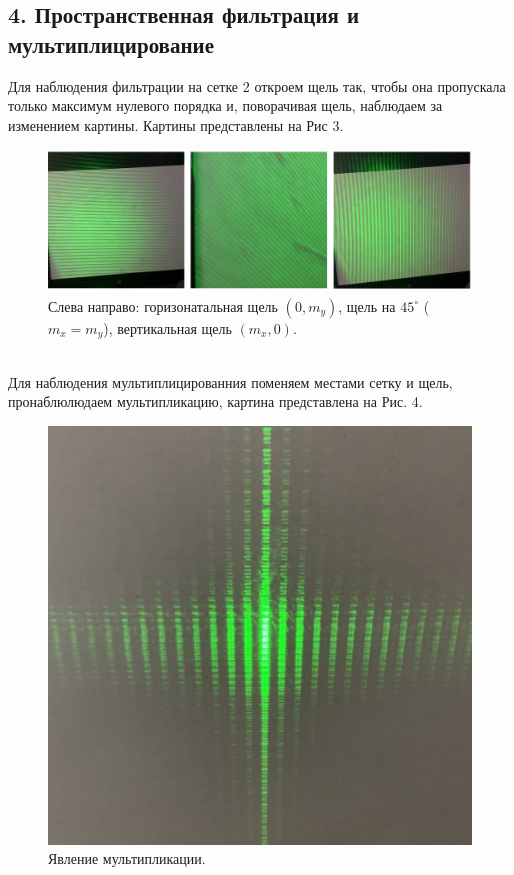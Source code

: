 \documentclass[a4paper,12pt]{article}
\begin{document}
\subsection*{4. Пространственная фильтрация и мультиплицирование}
Для наблюдения фильтрации на сетке 2 откроем щель так, чтобы она пропускала только максимум нулевого порядка и, поворачивая щель, наблюдаем за изменением картины. Картины представлены на Рис 3.
\begin{figure}[h]
\includegraphics[scale=0.5]{3.png}
\centering
\caption{Слева направо: горизонатальная щель $(0,m_y)$, щель на $45^\circ$ ($m_x = m_y$), вертикальная щель $(m_x,0)$.}
\end{figure}\\
Для наблюдения мультиплицированния поменяем местами сетку и щель, пронаблюлюдаем мультипликацию, картина представлена на Рис. 4.
\begin{figure}[h]
\includegraphics[scale=0.7]{4.png}
\centering
\caption{Явление мультипликации.}
\end{figure}
\end{document}
